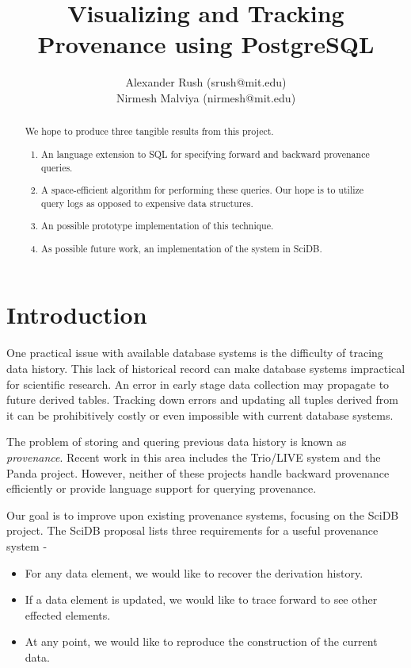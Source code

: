 \documentclass[11pt]{article}
\title{Visualizing and Tracking Provenance using PostgreSQL}
\author{Alexander Rush (srush@mit.edu)\\ Nirmesh Malviya (nirmesh@mit.edu)}
\begin{document}
\maketitle

\begin{abstract}
 We hope to produce three tangible results from this project. 

\begin{enumerate}
\item An language extension to SQL for specifying forward and backward provenance queries.
\item A space-efficient algorithm for performing these queries. Our hope is to utilize query logs as opposed to expensive data structures.
\item An possible prototype implementation of this technique.
\item As possible future work, an implementation of the system in SciDB.
\end{enumerate}
\end{abstract}

\section{Introduction}

One practical issue with available database systems is the difficulty of tracing data history. This lack of historical record can make database systems impractical for scientific research. An error in early stage data collection may propagate to future derived tables. Tracking down errors and updating all tuples derived from it can be prohibitively costly or even impossible with current database systems. 

The problem of storing and quering previous data history is known as \emph{provenance}. Recent work in this area includes the Trio/LIVE system and the Panda project. However, neither of these projects handle backward provenance efficiently or provide language support for querying provenance.

Our goal is to improve upon existing provenance systems, focusing on the SciDB project. The SciDB proposal \cite{stonebraker9requirements} lists three requirements for a useful provenance system -

\begin{itemize}
\item For any data element, we would like to recover the derivation history. 
\item If a data element is updated, we would like to trace forward to see other effected elements.
\item At any point, we would like to reproduce the construction of the current data. 
\end{itemize}
\end{document}
